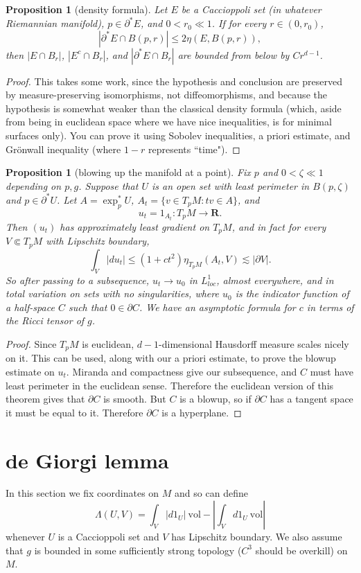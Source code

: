 \documentclass[reqno,12pt,letterpaper]{amsart}
\newcommand{\RR}{\mathbf{R}}
\newcommand{\vol}{\mathrm{vol}}
\newtheorem{proposition}[theorem]{Proposition}
\theoremstyle{definition}
\numberwithin{equation}{section}
\begin{document}
\begin{proposition}[density formula]
Let $E$ be a Caccioppoli set (in whatever Riemannian manifold), $p \in \partial^* E$, and $0 < r_0 \ll 1$.
If for every $r \in (0, r_0)$,
$$|\partial^* E \cap B(p, r)| \leq 2\eta(E, B(p, r)),$$
then
$|E \cap B_r|$, $|E^c \cap B_r|$, and $|\partial^* E \cap B_r|$ are bounded from below by $Cr^{d - 1}$.
\end{proposition}
\begin{proof}
This takes some work, since the hypothesis and conclusion are preserved by measure-preserving isomorphisms, not diffeomorphisms, and because the hypothesis is somewhat weaker than the classical density formula (which, aside from being in euclidean space where we have nice inequalities, is for minimal surfaces only).
You can prove it using Sobolev inequalities, a priori estimate, and Gr\"onwall inequality (where $1 - r$ represents ``time").
\end{proof}

\begin{proposition}[blowing up the manifold at a point]
Fix $p$ and $0 < \zeta \ll 1$ depending on $p,g$.
Suppose that $U$ is an open set with least perimeter in $B(p, \zeta)$ and $p \in \partial^* U$.
Let $A = \exp_p^* U$, $A_t = \{v \in T_pM: tv \in A\}$, and
$$u_t = 1_{A_t}: T_pM \to \RR.$$
Then $(u_t)$ has approximately least gradient on $T_pM$, and in fact for every $V \Subset T_pM$ with Lipschitz boundary,
$$\int_V |du_t| \leq (1 + ct^2) \eta_{T_pM}(A_t, V) \lesssim |\partial V|.$$
So after passing to a subsequence, $u_t \to u_0$ in $L^1_{loc}$, almost everywhere, and in total variation on sets with no singularities, where $u_0$ is the indicator function of a half-space $C$ such that $0 \in \partial C$.
We have an asymptotic formula for $c$ in terms of the Ricci tensor of $g$.
\end{proposition}
\begin{proof}
Since $T_pM$ is euclidean, $d-1$-dimensional Hausdorff measure scales nicely on it.
This can be used, along with our a priori estimate, to prove the blowup estimate on $u_t$.
Miranda and compactness give our subsequence, and $C$ must have least perimeter in the euclidean sense.
Therefore the euclidean version of this theorem gives that $\partial C$ is smooth.
But $C$ is a blowup, so if $\partial C$ has a tangent space it must be equal to it.
Therefore $\partial C$ is a hyperplane.
\end{proof}

\section{de Giorgi lemma}
In this section we fix coordinates on $M$ and so can define
$$\Lambda(U, V) = \int_V |d1_U| ~\vol - \left|\int_V d1_U ~\vol\right|$$
whenever $U$ is a Caccioppoli set and $V$ has Lipschitz boundary.
We also assume that $g$ is bounded in some sufficiently strong topology ($C^3$ should be overkill) on $M$.
\end{document}
